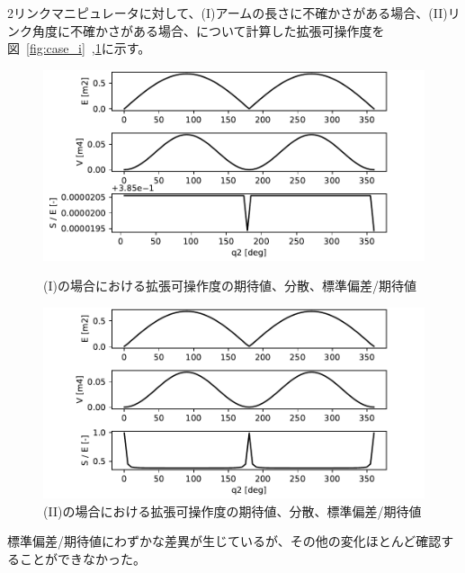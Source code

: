 \documentclass[10pt,a4j,twocolumn]{ltjsarticle}
\begin{document}
2リンクマニピュレータに対して、(I)アームの長さに不確かさがある場合、(II)リンク角度に不確かさがある場合、について計算した拡張可操作度を図~\ref{fig:case_i}~,\ref{fig:case_ii}に示す。
\begin{figure}
  \centering
  \includegraphics[width=80truemm]{./simulation/length_plots.pdf}
  \caption{(I)の場合における拡張可操作度の期待値、分散、標準偏差/期待値}
  \label{fig:case_i}
  \includegraphics[width=80truemm]{./simulation/angle_plots.pdf}
  \caption{(II)の場合における拡張可操作度の期待値、分散、標準偏差/期待値}
  \label{fig:case_ii}
\end{figure}
標準偏差/期待値にわずかな差異が生じているが、その他の変化ほとんど確認することができなかった。
\end{document}
